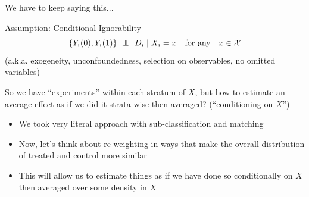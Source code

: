 \documentclass[xcolor=dvipsnames]{beamer}
\newcommand\E{\mathbb{E}}
\newcommand\indep{\protect\mathpalette{\protect\independenT}{\perp}}
\def\independenT#1#2{\mathrel{\rlap{$#1#2$}\mkern2mu{#1#2}}}
\begin{document}
\begin{frame}{We have to keep saying this...}

\begin{block}{Assumption: Conditional Ignorability}
$$ \{ Y_i(0), Y_i(1)\} \ \indep \ D_i \mid X_i = x \quad \text{for any} \quad x \in \mathcal{X} $$
\smallskip
\footnotesize
(a.k.a. exogeneity, unconfoundedness, selection on observables, no omitted variables) \\
\end{block}
\bigskip
\small
{} So we have ``experiments'' within each stratum of $X$, but how to estimate an average effect as if we did it strata-wise then averaged? (``conditioning on $X$'')\\
\small
\begin{itemize}
\item<3-> We took very literal approach with sub-classification and matching
\item<4-> Now, let's think about re-weighting in ways that make the overall distribution of treated and control more similar
\item<5-> This will allow us to estimate things as if we have done so conditionally on $X$ then averaged over some density in $X$
\end{itemize}
\end{frame}

%
%
\end{document}
